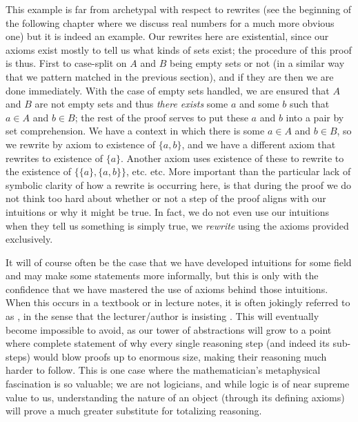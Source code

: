 \documentclass[11pt]{article}
\begin{document}
This example is far from archetypal with respect to rewrites (see the beginning of the following chapter where we discuss real numbers for a much more obvious one) but it is indeed an example. Our rewrites here are existential, since our axioms exist mostly to tell us what kinds of sets exist; the procedure of this proof is thus. First to case-split on $A$ and $B$ being empty sets or not (in a similar way that we pattern matched in the previous section), and if they are then we are done immediately. With the case of empty sets handled, we are ensured that $A$ and $B$ are not empty sets and thus \emph{there exists} some $a$ and some $b$ such that $a \in A$ and $b \in B$; the rest of the proof serves to put these $a$ and $b$ into a pair by set comprehension. We have a context in which there is some $a \in A$ and $b \in B$, so we rewrite by axiom to existence of $\{a,b\}$, and we have a different axiom that rewrites to existence of $\{a\}$. Another axiom uses existence of these to rewrite to the existence of $\{\{a\}, \{a,b\}\}$, etc. etc. More important than the particular lack of symbolic clarity of how a rewrite is occurring here, is that during the proof we do not think too hard about whether or not a step of the proof aligns with our intuitions or why it might be true. In fact, we do not even use our intuitions when they tell us something is simply true, we \emph{rewrite} using the axioms provided exclusively.

It will of course often be the case that we have developed intuitions for some field and may make some statements more informally, but this is only with the confidence that we have mastered the use of axioms behind those intuitions. When this occurs in a textbook or in lecture notes, it is often jokingly referred to as , in the sense that the lecturer/author is insisting . This will eventually become impossible to avoid, as our tower of abstractions will grow to a point where complete statement of why every single reasoning step (and indeed its sub-steps) would blow proofs up to enormous size, making their reasoning much harder to follow. This is one case where the mathematician's metaphysical fascination is so valuable; we are not logicians, and while logic is of near supreme value to us, understanding the nature of an object (through its defining axioms) will prove a much greater substitute for totalizing reasoning.
\end{document}
